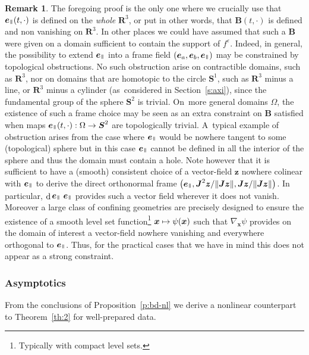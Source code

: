 \documentclass[10pt]{amsart}
\newcommand\mto{\mathchoice{\longmapsto}{\mapsto}{\mapsto}{\mapsto}}
\let\eps\varepsilon
\DeclareMathOperator\dD{d}\let\dd\dD
\theoremstyle{plain}
\theoremstyle{definition}
\newtheorem{remark}[theorem]{Remark}
\newcommand\br{\begin{remark}}
\newcommand\er{\end{remark}}
\newcommand\R{\mathbf R}
\newcommand\bB{{\boldsymbol B}}
\newcommand\bJ{{\boldsymbol J}}
\newcommand\bS{{\boldsymbol S}}
\newcommand\bfx{{\boldsymbol x}}
\newcommand\bfz{{\boldsymbol z}}
\DeclareMathOperator{\beD}{\boldsymbol{e}}
\newcommand\eDpar{\beD_\mypar}
\newcommand\eDa{\beD_a}
\newcommand\eDb{\beD_b}
\newcommand{\mypar}{{\mkern3mu\vphantom{\perp}\vrule depth 0pt\mkern2mu\vrule depth 0pt\mkern3mu}}
\begin{document}
\br\label{rk:frame}
The foregoing proof is the only one where we crucially use that $\eDpar(t,\cdot)$
is defined on the \emph{whole} $\R^3$, or put in other words, that $\bB(t,\cdot)$ is defined and non vanishing on $\R^3$. In other places we could have assumed that such a $\bB$ were given on a domain sufficient to contain the support of $f^\eps$. Indeed, in general, the possibility to extend $\eDpar$ into a frame field $(\eDa,\eDb,\eDpar)$ may be constrained by topological obstructions. No such obstruction arise on contractible domains, such as $\R^3$, nor on domains that are homotopic to the circle $\bS^1$, such as $\R^3$ minus a line, or $\R^3$ minus a cylinder (as~considered in Section~\ref{s:axi}), since the fundamental group of the sphere $\bS^2$ is trivial. On~more general domains $\Omega$, the existence of such a frame choice may be seen as an extra constraint on $\bB$ satisfied when maps $\eDpar (t,\cdot):\Omega\to\bS^2$ are topologically trivial. A~typical example of obstruction arises from the case where $\eDpar$ would be nowhere tangent to some (topological) sphere but in this case $\eDpar$ cannot be defined in all the interior of the sphere and thus the domain must contain a hole. Note however that it is sufficient to have a (smooth) consistent choice of a vector-field $\bfz$ nowhere colinear with $\eDpar$ to derive the direct orthonormal frame $\left(\eDpar,\bJ^2\bfz/\|\bJ\bfz\|,\bJ\bfz/\|\bJ\bfz\|\right)$. In particular, $\dD\eDpar\,\eDpar$ provides such a vector field wherever it does not vanish. Moreover a large class of confining geometries are precisely designed to ensure the existence of a smooth level set function\footnote{Typically with compact level sets.} $\bfx\mto \psi(\bfx)$ such that $\nabla_\bfx\psi$ provides on the domain of interest a vector-field nowhere vanishing and everywhere orthogonal to $\eDpar$. Thus, for the practical cases that we have in mind this does not appear as a strong constraint.
\er

\subsubsection{Asymptotics}

From the conclusions of Proposition~\ref{p:bd-nl} we derive a nonlinear counterpart to Theorem~\ref{th:2} for well-prepared data.
\end{document}
